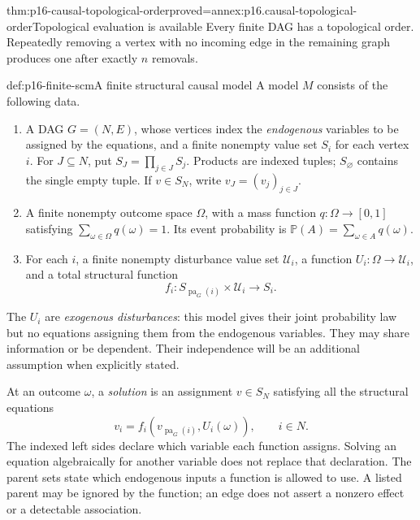 \begin{hbtheorem}{thm:p16-causal-topological-order}{proved=annex:p16.causal-topological-order}{Topological evaluation is available}
Every finite DAG has a topological order. Repeatedly removing a vertex
with no incoming edge in the remaining graph produces one after exactly
\(n\) removals.
\end{hbtheorem}

\begin{hbdefinition}{def:p16-finite-scm}{A finite structural causal model}
A model \(M\) consists of the following data.
\begin{enumerate}
\item A DAG \(G=(N,E)\), whose vertices index the \emph{endogenous}
      variables to be assigned by the equations, and a finite nonempty
      value set \(S_i\) for each vertex \(i\). For \(J\subseteq N\), put
      \(S_J=\prod_{j\in J}S_j\). Products are indexed tuples;
      \(S_\varnothing\) contains the single empty tuple. If
      \(v\in S_N\), write \(v_J=(v_j)_{j\in J}\).
\item A finite nonempty outcome space \(\Omega\), with a mass
      function \(q:\Omega\to[0,1]\) satisfying
      \(\sum_{\omega\in\Omega}q(\omega)=1\). Its event probability
      is \(\mathbb P(A)=\sum_{\omega\in A}q(\omega)\).
\item For each \(i\), a finite nonempty disturbance value set
      \(\mathcal U_i\), a function \(U_i:\Omega\to\mathcal U_i\),
      and a total structural function
      \[
       f_i:S_{\operatorname{pa}_G(i)}\times\mathcal U_i\longrightarrow S_i.
      \]
\end{enumerate}
The \(U_i\) are \emph{exogenous disturbances}: this model gives their
joint probability law but no equations assigning them from the endogenous
variables. They may share information or be dependent. Their independence
will be an additional assumption when explicitly stated.

At an outcome \(\omega\), a \emph{solution} is an assignment
\(v\in S_N\) satisfying all the structural equations
\[
 v_i=f_i(v_{\operatorname{pa}_G(i)},U_i(\omega)),\qquad i\in N.
\]
The indexed left sides declare which variable each function assigns.
Solving an equation algebraically for another variable does not replace
that declaration. The parent sets state which endogenous inputs a function
is allowed to use. A listed parent may be ignored by the function; an edge
does not assert a nonzero effect or a detectable association.
\end{hbdefinition}

